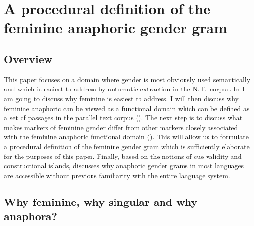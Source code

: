 \documentclass[output=collectionpaper]{langsci/langscibook}
\begin{document}
\section{A procedural definition of the feminine anaphoric gender gram}
\label{sec:BW:2}

\subsection{Overview}
\label{sec:BW:2.1}

This paper focuses on a domain where gender is most obviously used semantically and which is easiest to address by automatic extraction in the N.T.\ corpus. In  I am going to discuss why feminine is easiest to address. I will then discuss why feminine anaphoric can be viewed as a functional domain which can be defined as a set of passages in the parallel text corpus (). The next step is to discuss what makes markers of feminine gender differ from other markers closely associated with the feminine anaphoric functional domain (). This will allow us to formulate a procedural definition of the feminine gender gram which is sufficiently elaborate for the purposes of this paper. Finally, based on the notions of cue validity and constructional islands,  discusses why anaphoric gender grams in most languages are accessible without previous familiarity with the entire language system.

\subsection{Why feminine, why singular and why anaphora?}
\label{sec:BW:2.2}
\end{document}
